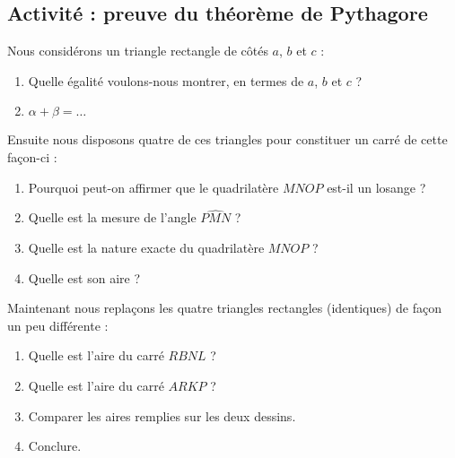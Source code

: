 
\subsection*{Activité : preuve du théorème de Pythagore}

Nous considérons un triangle rectangle de côtés \( a\), \( b\) et \( c\) :
\begin{center}
   
\end{center}

\begin{enumerate}
    \item
        Quelle égalité voulons-nous montrer, en termes de \( a\), \( b\) et \( c\) ?
    \item
        \( \alpha+\beta=\ldots\)
\end{enumerate}

Ensuite nous disposons quatre de ces triangles pour constituer un carré de cette façon-ci :
\begin{center}
   
\end{center}

\begin{enumerate}
    \item
        Pourquoi peut-on affirmer que le quadrilatère \( MNOP\) est-il un losange ?
    \item
        Quelle est la mesure de l'angle $\widehat{PMN}$ ?
    \item
        Quelle est la nature exacte du quadrilatère \( MNOP\) ?
    \item
        Quelle est son aire ?
\end{enumerate}

Maintenant nous replaçons les quatre triangles rectangles (identiques) de façon un peu différente :

\begin{center}
   
\end{center}

\begin{enumerate}
    \item
        Quelle est l'aire du carré \( RBNL\) ?
    \item
        Quelle est l'aire du carré \( ARKP\) ?
    \item
        Comparer les aires remplies sur les deux dessins.
    \item
        Conclure.
\end{enumerate}

